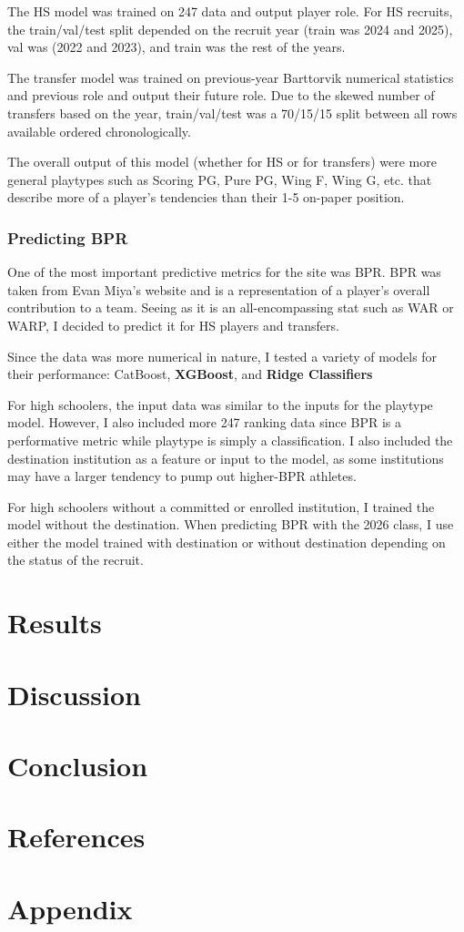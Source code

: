 \documentclass[11pt]{article}
\begin{document}
The HS model was trained on 247 data and output player role. For HS recruits, the train/val/test split depended on the recruit year (train was 2024 and 2025), val was (2022 and 2023), and train was the rest of the years.

The transfer model was trained on previous-year Barttorvik numerical statistics and previous role and output their future role. Due to the skewed number of transfers based on the year, train/val/test was a 70/15/15 split between all rows available ordered chronologically.

The overall output of this model (whether for HS or for transfers) were more general playtypes such as Scoring PG, Pure PG, Wing F, Wing G, etc. that describe more of a player's tendencies than their 1-5 on-paper position.


\subsubsection{Predicting BPR}

One of the most important predictive metrics for the site was BPR. BPR was taken from Evan Miya's website and is a representation of a player's overall contribution to a team. Seeing as it is an all-encompassing stat such as WAR or WARP, I decided to predict it for HS players and transfers.

Since the data was more numerical in nature, I tested a variety of models for their performance: CatBoost, \textbf{XGBoost}, and \textbf{Ridge Classifiers}

For high schoolers, the input data was similar to the inputs for the playtype model. However, I also included more 247 ranking data since BPR is a performative metric while playtype is simply a classification. I also included the destination institution as a feature or input to the model, as some institutions may have a larger tendency to pump out higher-BPR athletes.

For high schoolers without a committed or enrolled institution, I trained the model without the destination. When predicting BPR with the 2026 class, I use either the model trained with destination or without destination depending on the status of the recruit.



\section{Results}

\section{Discussion}

\section{Conclusion}

\section*{References}

\appendix

\section{Appendix}
\end{document}
